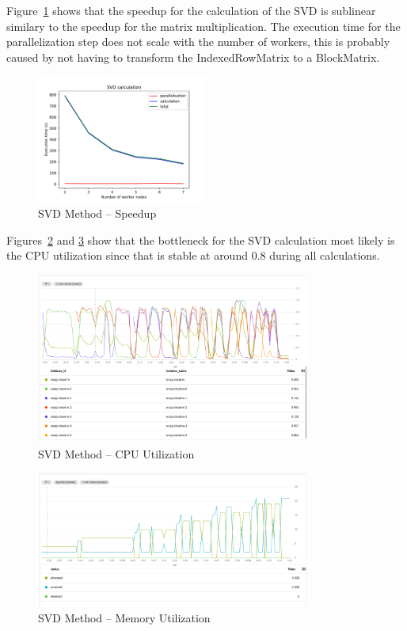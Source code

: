 \documentclass{prog_report}
\begin{document}
Figure~\ref{fig:svd} shows that the speedup for the calculation of the SVD is sublinear similary to the speedup for the matrix multiplication. The execution time for the parallelization step does not scale with the number of workers, this is probably caused by not having to transform the IndexedRowMatrix to a BlockMatrix.
\begin{figure}[h!]
    \centering
    \includegraphics[width=0.5\textwidth]{img/svd-speedup}
    \caption{SVD Method – Speedup}
    \label{fig:svd}
\end{figure}

Figures~\ref{fig:svd-cpu} and \ref{fig:svd-mem} show that the bottleneck for the SVD calculation most likely is the CPU utilization since that is stable at around 0.8 during all calculations.

\begin{figure}[h!]
    \centering
    \includegraphics[width=0.8\textwidth]{img/svd-cpu}
    \caption{SVD Method – CPU Utilization}
    \label{fig:svd-cpu}
\end{figure}

\begin{figure}[h!]
    \centering
    \includegraphics[width=0.8\textwidth]{img/svd-memory}
    \caption{SVD Method – Memory Utilization}
    \label{fig:svd-mem}
\end{figure}
\end{document}
